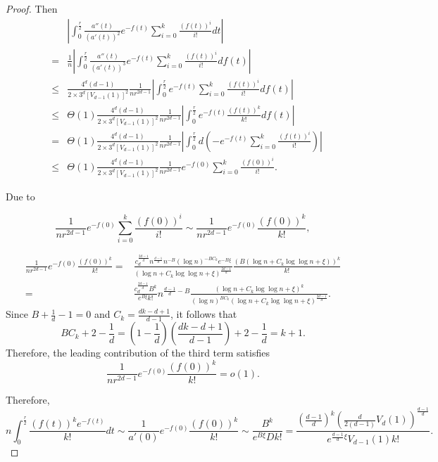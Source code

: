 \documentclass[preprint,12pt]{elsarticle}
\begin{document}
\begin{proof}
	Then
	\begin{eqnarray*}
		&&\left|\int_{0}^{\frac r2} \frac{a''(t)}{(a'(t))^2}e^{-f(t)}\sum_{i=0}^{k}\frac{(f(t))^i}{i!}dt\right|\\
		&=&\frac{1}{n}\left|\int_{0}^{\frac r2} \frac{a''(t)}{(a'(t))^3}e^{-f(t)}\sum_{i=0}^{k}\frac{(f(t))^i}{i!}df(t)\right|\\
		&\leq & \frac{4^d(d-1)}{2\times 3^d[V_{d-1}(1)]^2} \frac{1}{nr^{2d-1}} \left|\int_{0}^{\frac r2} e^{-f(t)}\sum_{i=0}^{k}\frac{(f(t))^i}{i!}df(t)\right|\\
		&\leq & \Theta(1)\frac{4^d(d-1)}{2\times 3^d[V_{d-1}(1)]^2} \frac{1}{nr^{2d-1}} \left|\int_{0}^{\frac r2} e^{-f(t)}\frac{(f(t))^k}{k!}df(t)\right|\\
		&= & \Theta(1)\frac{4^d(d-1)}{2\times 3^d[V_{d-1}(1)]^2} \frac{1}{nr^{2d-1}} \left|\int_{0}^{\frac r2} d\left(-e^{-f(t)}\sum_{i=0}^{k}\frac{(f(t))^i}{i!}\right) \right|\\
		&\leq & \Theta(1)\frac{4^d(d-1)}{2\times 3^d[V_{d-1}(1)]^2} \frac{1}{nr^{2d-1}}e^{-f(0)}\sum_{i=0}^{k}\frac{(f(0))^i}{i!}.
	\end{eqnarray*}
	
	Due to
	
	$$
	\frac{1}{nr^{2d-1}}e^{-f(0)}\sum_{i=0}^{k}\frac{(f(0))^i}{i!}  \sim
	\frac{1}{nr^{2d-1}}e^{-f(0)}\frac{(f(0))^k}{k!} ,
	$$
	
	\begin{equation*}
		\begin{aligned}
			\frac{1}{nr^{2d-1}}e^{-f(0)}\frac{(f(0))^k}{k!} = & \frac{c_d^{\frac{2d-1}{d}}n^{\frac{d-1}{d}}n^{-B}(\log n)^{-BC_k}e^{-B\xi}}{\left(\log n+ C_k \log\log n+\xi\right)^{\frac{2d-1}{d}}} \frac{(B\left( \log n+ C_k \log\log n+\xi\right))^k}{k!} \\
			= & \frac{c_d^{\frac{2d-1}{d}}B^k}{e^{B\xi}k!}n^{\frac{d-1}{d}-B}\frac{\left( \log n+ C_k \log\log n+\xi\right)^k}{(\log n)^{BC_k}\left(\log n+ C_k \log\log n+\xi\right)^{\frac{2d-1}{d}}}.
		\end{aligned}
	\end{equation*}
	Since $B + \frac{1}{d} - 1 = 0$ and $C_k=\frac{dk-d+1}{d-1}$, it follows that
	$$
	BC_k + 2 - \frac{1}{d} = \left(1-\frac{1}{d}\right)\left(\frac{dk-d+1}{d-1}\right)+2-\frac{1}{d} = k + 1.
	$$
	Therefore, the leading contribution of the third term satisfies
	$$
	\frac{1}{nr^{2d-1}}e^{-f(0)}\frac{(f(0))^k}{k!} = o(1).
	$$
	

	Therefore,
	$$
	n\int_{0}^{\frac r2} \frac{(f(t))^ke^{-f(t)}}{k!}dt\sim \frac{1}{a'(0)}e^{-f(0)}\frac{(f(0))^k}{k!} \sim \frac{B^k}{e^{B\xi}Dk!}=\frac{\left(\frac{d-1}{d}\right)^k\left(\frac{d}{2(d-1)}V_d(1)\right)^{\frac{d-1}{d}}}{e^{\frac{d-1}{d}\xi}{V_{d-1}(1)}k!}.
	$$	
\end{proof}
\end{document}
